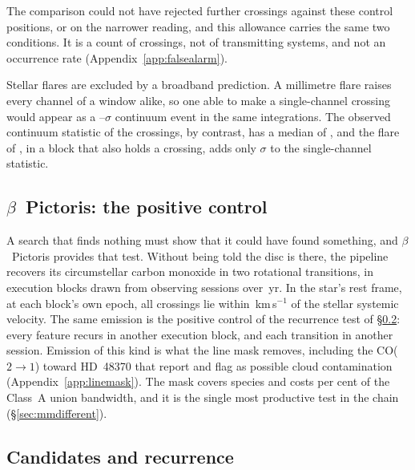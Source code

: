The comparison could not have rejected \CeAddLim{} further crossings
against these control positions, or \FrNarrowAddLim{} on the narrower
reading, and this allowance carries the same two conditions. It is a count of
crossings, not of transmitting systems, and not an occurrence rate
(Appendix~\ref{app:falsealarm}).

Stellar flares are excluded by a broadband prediction. A millimetre flare
raises every channel of a window alike, so one able to make a single-channel
crossing would appear as a \FlPredLo--\FlPredHi$\sigma$ continuum event in
the same integrations. The observed continuum statistic of the crossings, by
contrast, has a median of \FlObsMed, and the \FlEgStar{} flare of
\citet{MacGregor2020}, in a block that also holds a crossing, adds only
\FlEgContrib$\sigma$ to the single-channel statistic.

\subsection{$\beta$~Pictoris: the positive control}
\label{sec:bpicval}

A search that finds nothing must show that it could have found something,
and $\beta$~Pictoris provides that test. Without being told the disc is
there, the pipeline recovers its circumstellar carbon monoxide
\citep{Dent2014,Matra2017} in two rotational transitions, in
\CsBpCoBlocks{} execution blocks drawn from \CsBpCoSess{} observing sessions
over \BpBaselineYr\,yr. In the star's rest frame, at each block's own epoch,
all \BpicPanelNCo{} crossings lie within \BpicDvCoHi\,km\,s$^{-1}$ of the
stellar systemic velocity. The same emission is the positive control of the
recurrence test of \S\ref{sec:etacrv}: every feature recurs in another
execution block, and each transition in another session. Emission of this
kind is what the line mask removes, including the CO($2{\to}1$) toward
HD~48370 that \citet{Cataldi2023} report and flag as possible cloud
contamination (Appendix~\ref{app:linemask}). The mask covers \FrNSpec{}
species and costs \MkMaskAPct{} per cent of the Class~A union bandwidth, and
it is the single most productive test in the chain
(\S\ref{sec:mmdifferent}).

\subsection{Candidates and recurrence}
\label{sec:etacrv}

